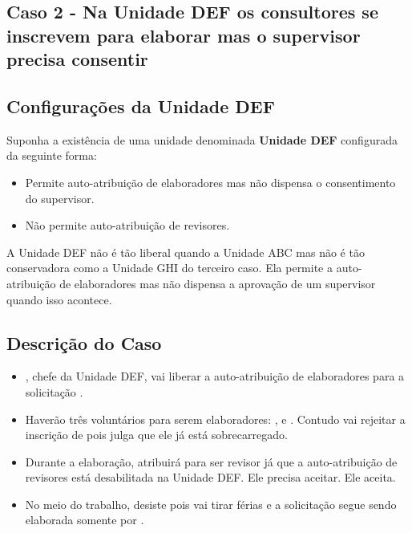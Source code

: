 \begin{landscape}
\section{Caso 2 - Na Unidade DEF os consultores se inscrevem para elaborar mas o supervisor precisa consentir}

\subsection*{Configurações da Unidade DEF}

Suponha a existência de uma unidade denominada \textbf{Unidade DEF} configurada da seguinte forma: 


\begin{itemize}
	\item Permite auto-atribuição de elaboradores mas não dispensa o consentimento do supervisor.
	\item Não permite auto-atribuição de revisores.
\end{itemize}

A Unidade DEF não é tão liberal quando a Unidade ABC mas não é tão conservadora como a Unidade GHI do terceiro caso. Ela permite a auto-atribuição de elaboradores mas não dispensa a aprovação de um supervisor quando isso acontece.

\subsection*{Descrição do Caso}

\begin{itemize}
	\item \SC, chefe da Unidade DEF, vai liberar a auto-atribuição de elaboradores para a solicitação \SOLT. 
	
	\item Haverão três voluntários para serem elaboradores: \EU, \ED e \EQ. Contudo \SC vai rejeitar a inscrição de \EQ pois julga que ele já está sobrecarregado.

	\item Durante a elaboração, \SC atribuirá \RU para ser revisor já que a auto-atribuição de revisores está desabilitada na Unidade DEF. Ele precisa aceitar. Ele aceita.

	\item No meio do trabalho, \ED desiste pois vai tirar férias e a solicitação segue sendo elaborada somente por \EU.
	

\end{itemize}
\end{landscape}

